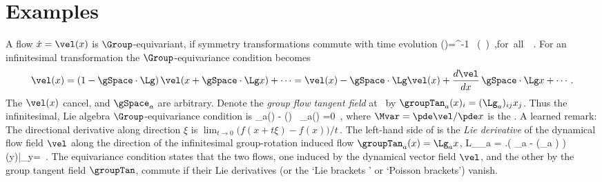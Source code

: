 


\section{Examples}
\label{exam:invariants}

        { \label{exam:EquiInfntmsl}
A flow $\dot{\ssp}= \vel(\ssp)$ is $\Group$-equivariant,
if symmetry transformations commute with time evolution
\beq
\vel(\ssp)=\LieEl^{-1} \, \vel(\LieEl \, \ssp)
\,,\qquad \mbox{for all } \LieEl \in {\Group}
\,.
For an infinitesimal transformation %
the $\Group$-equivariance condition %
becomes
\[
\vel(\ssp) =(1-\gSpace \cdot \Lg) \, \vel(\ssp+\gSpace \cdot \Lg \ssp) + \cdots
       =\vel(\ssp)- \gSpace \cdot \Lg \vel(\ssp)
             + \frac{d\vel}{d\ssp} \,\gSpace \cdot \Lg \ssp + \cdots
\,.
\]
The $\vel(x)$ cancel, and $\gSpace_a$ are arbitrary. Denote
the \emph{group flow tangent field} at \ssp\ by
$\groupTan_a(\ssp)_{i}= (\Lg_a){}_{ij} \ssp_j$. Thus the
infinitesimal, Lie algebra $\Group$-equivariance condition is
\beq
  \groupTan_a(\vel)  - \Mvar(\ssp) \, \groupTan_a(\ssp) =0
  \,,
where $\Mvar = {\pde \vel}/{\pde \ssp}$ is the \stabmat. %
A learned remark: The directional derivative along
direction $\xi$ is
\(
    \lim_{t \to 0} ({f(x+t\xi)-f(x))}/{t}
    \,.
\)
The left-hand side of  is
the {\em Lie derivative} of the dynamical flow
field $\vel$ along the direction of the infinitesimal
group-rotation induced flow $\groupTan_a(\ssp)= \Lg_a \ssp$,
\beq
{\cal L}_{\groupTan_a} \vel =
\left.\left(
  \Lg_a - (\Lg_a \ssp)
 \right) \vel(y)\right|_{y=\ssp}
\,.
The equivariance condition  states that the two
flows, one induced by the dynamical vector field $\vel$, and
the other by the group tangent field $\groupTan$, commute if
their Lie derivatives (or the `Lie brackets ' or `Poisson
brackets') vanish.
     
    } %

